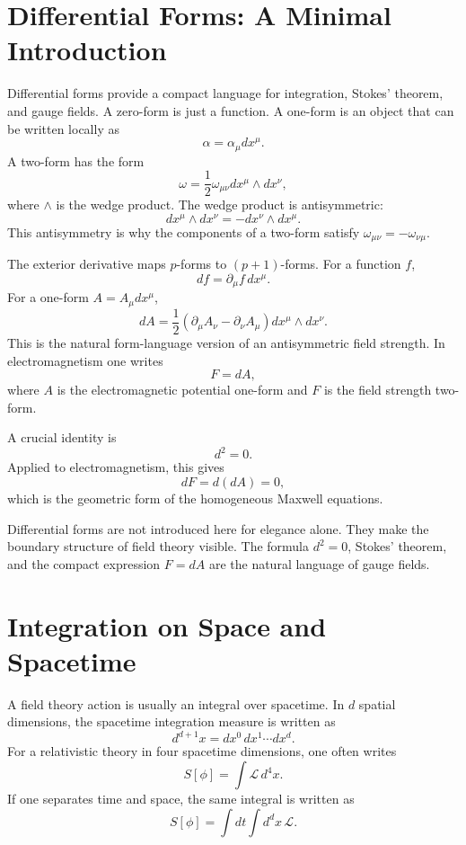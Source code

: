 \section{Differential Forms: A Minimal Introduction}

Differential forms provide a compact language for integration, Stokes' theorem,
and gauge fields. A zero-form is just a function. A one-form is an object that
can be written locally as
\[
    \alpha = \alpha_\mu dx^\mu.
\]
A two-form has the form
\[
    \omega = \frac{1}{2}\omega_{\mu\nu}dx^\mu\wedge dx^\nu,
\]
where \(\wedge\) is the wedge product. The wedge product is antisymmetric:
\[
    dx^\mu\wedge dx^\nu = -dx^\nu\wedge dx^\mu.
\]
This antisymmetry is why the components of a two-form satisfy
\(\omega_{\mu\nu}=-\omega_{\nu\mu}\).

The exterior derivative maps \(p\)-forms to \((p+1)\)-forms. For a function
\(f\),
\[
    df = \partial_\mu f\,dx^\mu.
\]
For a one-form \(A=A_\mu dx^\mu\),
\[
    dA = \frac{1}{2}(\partial_\mu A_\nu-\partial_\nu A_\mu)
    dx^\mu\wedge dx^\nu.
\]
This is the natural form-language version of an antisymmetric field strength.
In electromagnetism one writes
\[
    F=dA,
\]
where \(A\) is the electromagnetic potential one-form and \(F\) is the field
strength two-form.

A crucial identity is
\[
    d^2=0.
\]
Applied to electromagnetism, this gives
\[
    dF = d(dA)=0,
\]
which is the geometric form of the homogeneous Maxwell equations.

\begin{remarkbox}
Differential forms are not introduced here for elegance alone. They make the
boundary structure of field theory visible. The formula \(d^2=0\), Stokes'
theorem, and the compact expression \(F=dA\) are the natural language of gauge
fields.
\end{remarkbox}

\section{Integration on Space and Spacetime}

A field theory action is usually an integral over spacetime. In \(d\) spatial
dimensions, the spacetime integration measure is written as
\[
    d^{d+1}x = dx^0\,dx^1\cdots dx^d.
\]
For a relativistic theory in four spacetime dimensions, one often writes
\[
    S[\phi] = \int \mathcal{L}\,d^4x.
\]
If one separates time and space, the same integral is written as
\[
    S[\phi] = \int dt\int d^d x\,\mathcal{L}.
\]

